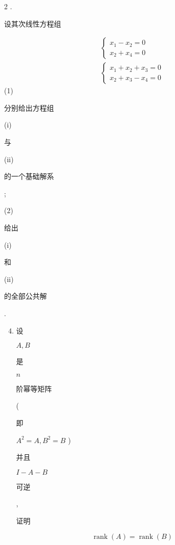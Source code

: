 \documentclass[10pt]{article}
\begin{document}
2 . \begin{CJK}{UTF8}{mj}设其次线性方程组\end{CJK}
$$
\begin{gathered}
\left\{\begin{array}{l}
x_{1}-x_{2}=0 \\
x_{2}+x_{4}=0
\end{array}\right. \\
\left\{\begin{array}{l}
x_{1}+x_{2}+x_{3}=0 \\
x_{2}+x_{3}-x_{4}=0
\end{array}\right.
\end{gathered}
$$
(1) \begin{CJK}{UTF8}{mj}分别给出方程组\end{CJK} (i) \begin{CJK}{UTF8}{mj}与\end{CJK} (ii) \begin{CJK}{UTF8}{mj}的一个基础解系\end{CJK};

(2) \begin{CJK}{UTF8}{mj}给出\end{CJK} (i) \begin{CJK}{UTF8}{mj}和\end{CJK} (ii) \begin{CJK}{UTF8}{mj}的全部公共解\end{CJK}.

\begin{enumerate}
  \setcounter{enumi}{3}
  \item \begin{CJK}{UTF8}{mj}设\end{CJK} $A, B$ \begin{CJK}{UTF8}{mj}是\end{CJK} $n$ \begin{CJK}{UTF8}{mj}阶幂等矩阵\end{CJK} (\begin{CJK}{UTF8}{mj}即\end{CJK} $A^{2}=A, B^{2}=B$ ) \begin{CJK}{UTF8}{mj}并且\end{CJK} $I-A-B$ \begin{CJK}{UTF8}{mj}可逆\end{CJK}, \begin{CJK}{UTF8}{mj}证明\end{CJK}
\end{enumerate}
$$
\operatorname{rank}(A)=\operatorname{rank}(B)
$$
\end{document}
